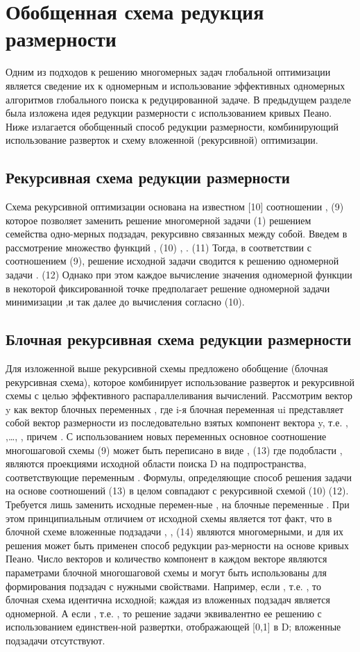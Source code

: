 \section{Обобщенная схема редукция размерности}
Одним из подходов к решению многомерных задач глобальной оптимизации является сведение их к одномерным и использование эффективных одномерных алгоритмов глобального поиска к редуцированной задаче. В предыдущем разделе была изложена идея редукции размерности с использованием кривых Пеано. Ниже излагается обобщенный способ редукции размерности, комбинирующий использование разверток и схему вложенной (рекурсивной) оптимизации.
\subsection{Рекурсивная схема редукции размерности}
Схема рекурсивной оптимизации основана на известном [10] соотношении
 ,				(9)
которое позволяет заменить решение многомерной задачи (1) решением семейства одно-мерных подзадач, рекурсивно связанных между собой.
Введем в рассмотрение множество функций 
 ,				(10)
 , .		(11)
Тогда, в соответствии с соотношением (9), решение исходной задачи  сводится к решению одномерной задачи
 .					(12)
Однако при этом каждое вычисление значения одномерной функции   в некоторой фиксированной точке предполагает решение одномерной задачи минимизации  ,и так далее до вычисления   согласно (10).
\subsection{Блочная рекурсивная схема редукции размерности}
Для изложенной выше рекурсивной схемы предложено обобщение (блочная рекурсивная схема), которое комбинирует использование разверток и рекурсивной схемы с целью эффективного распараллеливания вычислений.
Рассмотрим вектор y как вектор блочных переменных
 ,
где i-я блочная переменная ui представляет собой вектор размерности   из последовательно взятых компонент вектора y, т.е.  ,  ,…, , причем  .
С использованием новых переменных основное соотношение многошаговой схемы (9) может быть переписано в виде
	 ,				(13)
где подобласти  , являются проекциями исходной области поиска D на подпространства, соответствующие переменным  .
Формулы, определяющие способ решения задачи на основе соотношений (13) в целом совпадают с рекурсивной схемой (10)(12). Требуется лишь заменить исходные перемен-ные  , на блочные переменные  . 
При этом принципиальным отличием от исходной схемы является тот факт, что в блочной схеме вложенные подзадачи
	 , ,			(14)
являются многомерными, и для их решения может быть применен способ редукции раз-мерности на основе кривых Пеано.
Число векторов и количество компонент в каждом векторе являются параметрами блочной многошаговой схемы и могут быть использованы для формирования подзадач с нужными свойствами. Например, если  , т.е.  , то блочная схема идентична исходной; каждая из вложенных подзадач является одномерной. А если  , т.е.  , то решение задачи эквивалентно ее решению с использованием единствен-ной развертки, отображающей [0,1] в D; вложенные подзадачи отсутствуют.

